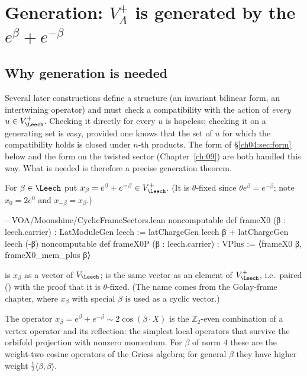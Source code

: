 \section{Generation: \texorpdfstring{$V_\Lambda^+$}{V+} is generated by the \texorpdfstring{$e^\beta+e^{-\beta}$}{e(b)+e(-b)}}\label{ch04:sec:generation}

\subsection{Why generation is needed}

Several later constructions define a structure (an invariant bilinear form, an intertwining
operator) and must check a compatibility with the action of \emph{every} $u\in V_\Leech^+$. Checking
it directly for every $u$ is hopeless; checking it on a generating set is easy, provided one knows
that the set of $u$ for which the compatibility holds is closed under $n$-th products. The form
of \S\ref{ch04:sec:form} below and the form  on the twisted sector
(Chapter~\ref{ch:09}) are both handled this way. What is needed is therefore a precise generation
theorem.

\begin{definition}\label{ch04:def:xbeta}
For $\beta\in\Leech$ put $x_\beta=e^\beta+e^{-\beta}\in V_\Leech^+$. (It is $\theta$-fixed since
$\theta e^\beta=e^{-\beta}$; note $x_0=2e^0$ and $x_{-\beta}=x_\beta$.)
\end{definition}

\begin{leancode}
-- VOA/Moonshine/CyclicFrameSectors.lean
noncomputable def frameX0 (β : leech.carrier) : LatModuleGen leech :=
  latChargeGen leech β + latChargeGen leech (-β)
noncomputable def frameX0P (β : leech.carrier) : VPlus := ⟨frameX0 β, frameX0_mem_plus β⟩
\end{leancode}

\begin{dictionary}
 is $x_\beta$ as a vector of $V_\Leech$;  is the same vector as an
element of $V_\Leech^+$, i.e.\ paired () with the proof  that it
is $\theta$-fixed. (The name comes from the Golay-frame chapter, where $x_\beta$ with special $\beta$
is used as a cyclic vector.)
\end{dictionary}

\begin{physics}
The operator $x_\beta=e^\beta+e^{-\beta}\sim2\cos(\beta\cdot X)$ is the $\mathbb Z_2$-even combination of a vertex operator and its reflection: the simplest local operators that survive the orbifold projection with nonzero momentum. For $\beta$ of norm $4$ these are the weight-two cosine operators of the Griess algebra; for general $\beta$ they have higher weight $\tfrac12\langle\beta,\beta\rangle$.
\end{physics}

